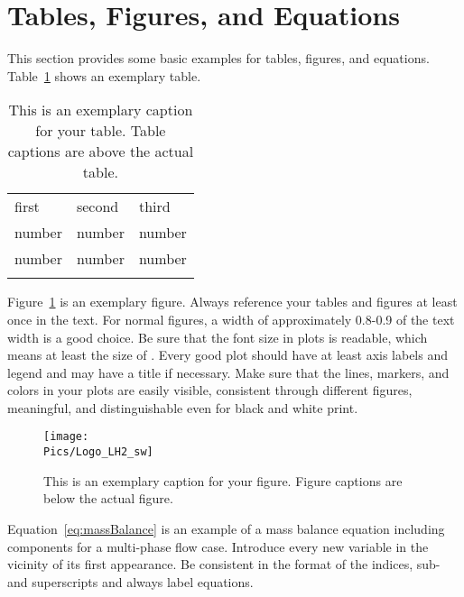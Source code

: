 \section{Tables, Figures, and Equations}
This section provides some basic examples for tables, figures, and equations.
Table~\ref{tab:exampleTable} shows an exemplary table. 

\begin{table}
\caption{This is an exemplary caption for your table. Table captions are above the actual table.}
\label{tab:exampleTable}       %
\centering
\begin{tabular}{lll}
\hline\noalign{\smallskip}
first & second & third  \\ %
\noalign{\smallskip}\hline\noalign{\smallskip}
number & number & number \\
number & number & number \\
\noalign{\smallskip}\hline
\end{tabular}
\end{table}

Figure~\ref{fig:exampleFigure} is an exemplary figure. 
Always reference your tables and figures at least once in the text. 
For normal figures, a width of approximately 0.8-0.9 of the text width  is a good choice.
Be sure that the font size in plots is readable, which means at least the size of . 
Every good plot should have at least axis labels and legend and may have a title if necessary.
Make sure that the lines, markers, and colors in your plots are easily visible, consistent through different figures,
meaningful, and distinguishable even for black and white print.

\begin{figure}
\centering
\texttt{[image: \\Pics/Logo\_LH2\_sw]}
%
\caption{This is an exemplary caption for your figure. Figure captions are below the actual figure.}
\label{fig:exampleFigure}       %
\end{figure}

Equation~\eqref{eq:massBalance} is an example of a mass balance equation including components
for a multi-phase flow case.
Introduce every new variable in the vicinity of its first appearance. 
Be consistent in the format of the indices, sub- and superscripts and always label equations.

